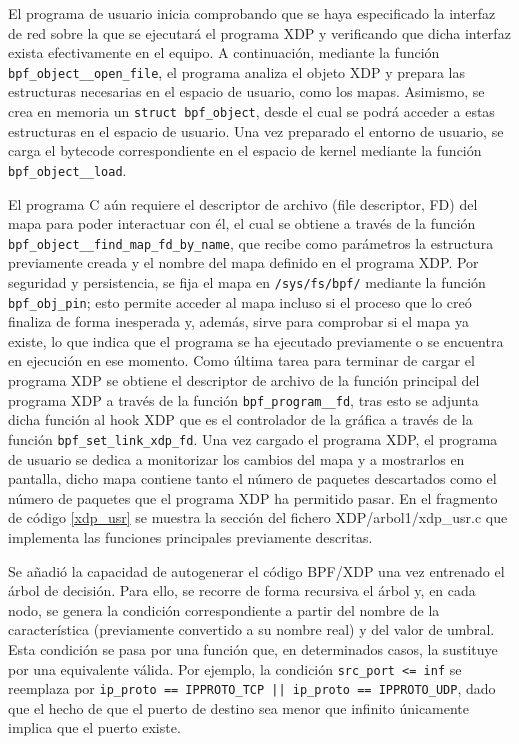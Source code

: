 El programa de usuario inicia comprobando que se haya especificado la interfaz de red sobre la que se ejecutará el programa XDP y verificando que dicha interfaz exista efectivamente en el equipo. A continuación, mediante la función \verb|bpf_object__open_file|, el programa analiza el objeto XDP y prepara las estructuras necesarias en el espacio de usuario, como los mapas. Asimismo, se crea en memoria un \verb|struct bpf_object|, desde el cual se podrá acceder a estas estructuras en el espacio de usuario. Una vez preparado el entorno de usuario, se carga el bytecode correspondiente en el espacio de kernel mediante la función \verb|bpf_object__load|.

El programa C aún requiere el descriptor de archivo (file descriptor, FD) del mapa para poder interactuar con él, el cual se obtiene a través de la función \verb|bpf_object__find_map_fd_by_name|, que recibe como parámetros la estructura previamente creada y el nombre del mapa definido en el programa XDP. Por seguridad y persistencia, se fija el mapa en \verb|/sys/fs/bpf/| mediante la función \verb|bpf_obj_pin|; esto permite acceder al mapa incluso si el proceso que lo creó finaliza de forma inesperada y, además, sirve para comprobar si el mapa ya existe, lo que indica que el programa se ha ejecutado previamente o se encuentra en ejecución en ese momento. Como última tarea para terminar de cargar el programa XDP se obtiene el descriptor de archivo de la función principal del programa XDP a través de la función \verb|bpf_program__fd|, tras esto se adjunta dicha función al hook XDP que es el controlador de la gráfica a través de la función \verb|bpf_set_link_xdp_fd|. Una vez cargado el programa XDP, el programa de usuario se dedica a monitorizar los cambios del mapa y a mostrarlos en pantalla, dicho mapa contiene tanto el número de paquetes descartados como el número de paquetes que el programa XDP ha permitido pasar. En el fragmento de código \ref{xdp_usr} se muestra la sección del fichero XDP/arbol1/xdp\_usr.c que implementa las funciones principales previamente descritas.


Se añadió la capacidad de autogenerar el código BPF/XDP una vez entrenado el árbol de decisión. Para ello, se recorre de forma recursiva el árbol y, en cada nodo, se genera la condición correspondiente a partir del nombre de la característica (previamente convertido a su nombre real) y del valor de umbral. Esta condición se pasa por una función que, en determinados casos, la sustituye por una equivalente válida. Por ejemplo, la condición \verb|src_port <= inf| se reemplaza por \verb#ip_proto == IPPROTO_TCP || ip_proto == IPPROTO_UDP#, dado que el hecho de que el puerto de destino sea menor que infinito únicamente implica que el puerto existe.

